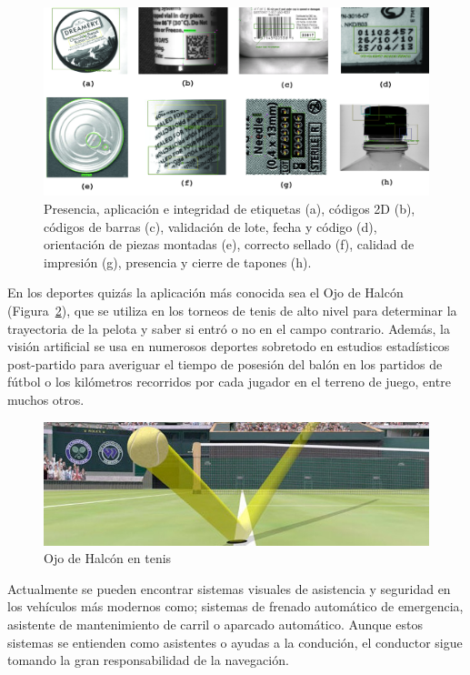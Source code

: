\begin{figure}[th]
\centering
\includegraphics[scale=0.17]{Figures/industry.png}
\decoRule
\caption[Visión en la industria]{Presencia, aplicación e integridad de etiquetas (a), códigos 2D (b), códigos de barras (c), validación de lote, fecha y código (d), orientación de piezas montadas (e), correcto sellado (f), calidad de impresión (g), presencia y cierre de tapones (h). }
\label{fig:Industry}
\end{figure}

En los deportes quizás la aplicación más conocida sea el Ojo de Halcón (Figura~\ref{fig:Ojohalcon}), que se utiliza en los torneos de tenis de alto nivel para determinar la trayectoria de la pelota y saber si entró o no en el campo contrario. Además, la visión artificial se usa en numerosos deportes sobretodo en estudios estadísticos post-partido para averiguar el tiempo de posesión del balón en los partidos de fútbol o los kilómetros recorridos por cada jugador en el terreno de juego, entre muchos otros.

\begin{figure}[th]
\centering
\includegraphics[scale=0.6]{Figures/ojohalcon.jpg}
\decoRule
\caption[Ojo de halcón]{Ojo de Halcón en tenis}
\label{fig:Ojohalcon}
\end{figure}

Actualmente se pueden encontrar sistemas visuales de asistencia y seguridad en los vehículos más modernos como; sistemas de frenado automático de emergencia, asistente de mantenimiento de carril o aparcado automático. Aunque estos sistemas se entienden como asistentes o ayudas a la condución, el conductor sigue tomando la gran responsabilidad de la navegación.

